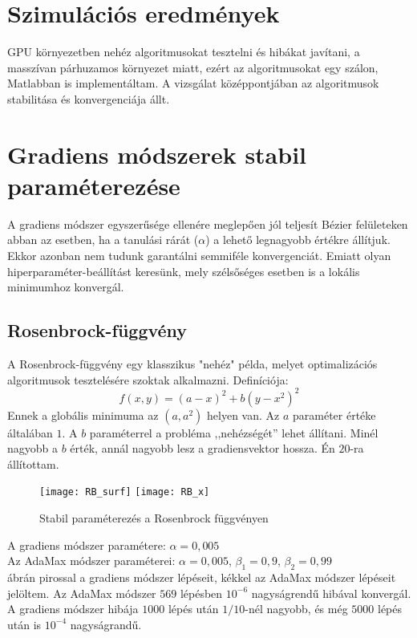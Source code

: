 \section{Szimulációs eredmények}

GPU környezetben nehéz algoritmusokat tesztelni és hibákat javítani, a masszívan párhuzamos környezet miatt, ezért az algoritmusokat egy szálon, Matlabban is implementáltam. A vizsgálat középpontjában az algoritmusok stabilitása és konvergenciája állt. 

\section{Gradiens módszerek stabil paraméterezése}

A gradiens módszer egyszerűsége ellenére meglepően jól teljesít Bézier felületeken abban az esetben, ha a tanulási rárát ($\alpha$) a lehető legnagyobb értékre állítjuk. Ekkor azonban nem tudunk garantálni semmiféle konvergenciát. Emiatt olyan hiperparaméter-beállítást keresünk, mely szélsőséges esetben is a lokális minimumhoz konvergál.

\subsection{Rosenbrock-függvény}
A Rosenbrock-függvény egy klasszikus "nehéz" példa, melyet optimalizációs algoritmusok tesztelésére szoktak alkalmazni. Definíciója:
$$ f(x,y) = (a-x)^2 + b(y-x^2)^2 $$
Ennek a globális minimuma az $(a,a^2)$ helyen van. Az $a$ paraméter értéke általában $1$. A $b$ paraméterrel a probléma ,,nehézségét'' lehet állítani. Minél nagyobb a $b$ érték, annál nagyobb lesz a gradiensvektor hossza. Én $20$-ra állítottam.
\begin{figure}[H]
	\centering
	\texttt{[image: RB\_surf]}
	\hspace{5pt}
	\texttt{[image: RB\_x]}
	\caption{Stabil paraméterezés a Rosenbrock függvényen}
	\label{fig:RB}
\end{figure}
A gradiens módszer paramétere: $\alpha = 0,005$ \\
Az AdaMax módszer paraméterei: $\alpha = 0,005$, $\beta_1 = 0,9$, $\beta_2 = 0,99$ \\
 ábrán pirossal a gradiens módszer lépéseit, kékkel az AdaMax módszer lépéseit jelöltem. Az AdaMax módszer $569$ lépésben $10^{-6}$ nagyságrendű hibával konvergál. A gradiens módszer hibája $1000$ lépés után $1/10$-nél nagyobb, és még $5000$ lépés után is $10^{-4}$ nagyságrandű.

